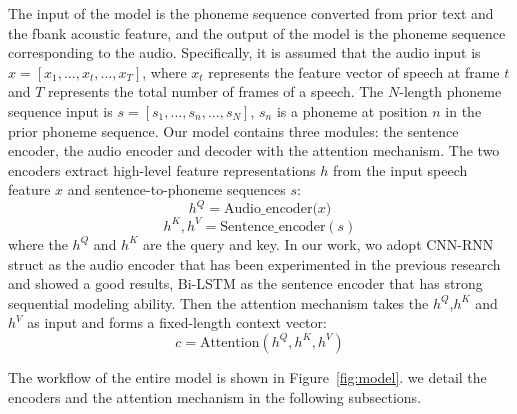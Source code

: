 \documentclass[a4paper]{article}
\begin{document}
The input of the model is the phoneme sequence converted from prior text and the fbank acoustic feature, and the output of the model is the phoneme sequence corresponding to the audio. Specifically, it is assumed that the audio input is $x = [x_1, ... ,x_t, ... ,x_T]$, where $x_t$ represents the feature vector of speech at frame $t$ and $T$ represents the total number of frames of a speech. The $N$-length phoneme sequence input is $s = [s_1, ... , s_n , ...,s_N]$, $s_n$ is a phoneme at position $n$ in the prior phoneme sequence. Our model contains three modules: the sentence encoder, the audio encoder and decoder with the attention mechanism. The two encoders extract high-level feature representations $h$ from the input speech feature $x$ and sentence-to-phoneme sequences $s$: 
\begin{equation}
   h^Q = \mathrm{Audio\_encoder(}x) \label{eq:audio_encoder}
\end{equation}
\begin{equation}
   h^K, h^V = \mathrm{Sentence\_encoder}(s) \label{eq:sentence_encoder}
\end{equation}
where the $h^Q$ and $h^K$ are the query and key. In our work, wo adopt CNN-RNN struct as the audio encoder that has been experimented in the previous research \cite{leung2019cnn} and showed a good results, Bi-LSTM as the sentence encoder that has strong sequential modeling ability. Then the attention mechanism takes the $h^Q$,$h^K$ and $h^V$ as input and forms a fixed-length context vector:
\begin{equation}
    c = \mathrm{Attention}(h^Q, h^K, h^V) \label{eq:attention}
\end{equation}

The workflow of the entire model is shown in Figure~\ref{fig:model}. we detail the encoders and the attention mechanism in the following subsections.
  
\end{document}
